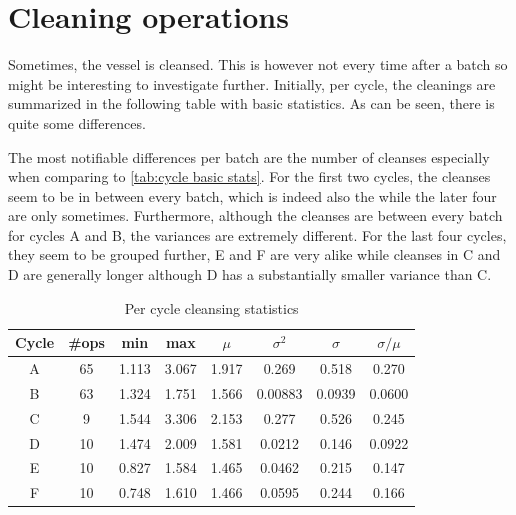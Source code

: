 \documentclass[../Thesis.tex]{subfiles}
\begin{document}


\newpage
\section{Cleaning operations}\label{sec:Data - Cleaning operations}
Sometimes, the vessel is cleansed. This is however not every time after a batch so might be interesting to investigate further. Initially, per cycle, the cleanings are summarized in the following table with basic statistics. As can be seen, there is quite some differences.

The most notifiable differences per batch are the number of cleanses especially when comparing to \autoref{tab:cycle basic stats}. For the first two cycles, the cleanses seem to be in between every batch, which is indeed also the while the later four are only sometimes. Furthermore, although the cleanses are between every batch for cycles A and B, the variances are extremely different. For the last four cycles, they seem to be grouped further, E and F are very alike while cleanses in C and D are generally longer although D has a substantially smaller variance than C.

\begin{table}[h]
    \centering
    \begin{tabular}{c|c|c|c|c|c|c|c}
        Cycle & \#ops & min   & max   & $\mu$ & $\sigma^2$ & $\sigma$ & $\sigma / \mu$ \\ \hline
        A     & 65    & 1.113 & 3.067 & 1.917 & 0.269      & 0.518    & 0.270          \\
        B     & 63    & 1.324 & 1.751 & 1.566 & 0.00883    & 0.0939   & 0.0600         \\
        C     & 9     & 1.544 & 3.306 & 2.153 & 0.277      & 0.526    & 0.245          \\
        D     & 10    & 1.474 & 2.009 & 1.581 & 0.0212     & 0.146    & 0.0922         \\
        E     & 10    & 0.827 & 1.584 & 1.465 & 0.0462     & 0.215    & 0.147          \\
        F     & 10    & 0.748 & 1.610 & 1.466 & 0.0595     & 0.244    & 0.166
    \end{tabular}
    \caption{Per cycle cleansing statistics}
    \label{tab:cycle cleansing stats stats}
\end{table}
\end{document}
